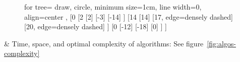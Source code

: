 \begin{easylist}
\begin{figure}[!htb]
	\begin{forest}
		for tree={
			draw,
			circle,
			minimum size=1cm,
			line width=0,
			align=center
		},
		[0
			[2
				[2]
				[-3]
				[-14]
			]
			[14
				[14]
				[17, edge={densely dashed}]
				[20, edge={densely dashed}]
			]
			[0
				[-12]
				[-18]
				[0]
			]
		]
	\end{forest}
\end{figure}

& Time, space, and optimal complexity of algorithms: See figure~\ref{fig:algos-complexity}

\end{easylist}
\clearpage
